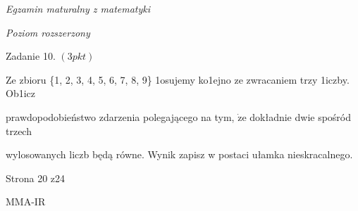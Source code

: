 \documentclass[a4paper,12pt]{article}
\begin{document}
{\it Egzamin maturalny z matematyki}

{\it Poziom rozszerzony}

Zadanie 10. $(3pkt)$

Ze zbioru \{1, 2, 3, 4, 5, 6, 7, 8, 9\} 1osujemy ko1ejno ze zwracaniem trzy 1iczby. Ob1icz

prawdopodobieństwo zdarzenia polegającego na tym, $\dot{\mathrm{z}}\mathrm{e}$ dokładnie dwie spośród trzech

wylosowanych liczb będą równe. Wynik zapisz w postaci ułamka nieskracalnego.

Strona 20 z24

MMA-IR
\end{document}
